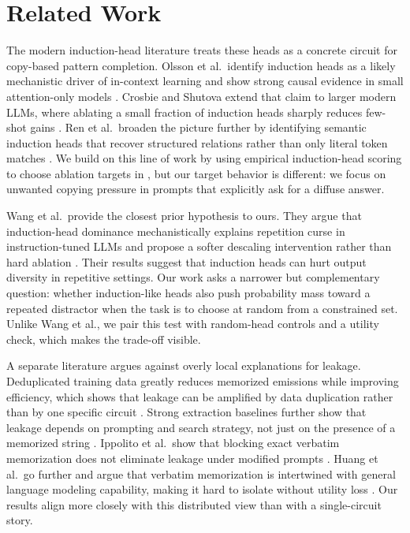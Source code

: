 \section{Related Work}
\label{sec:related-work}

 The modern induction-head literature treats these heads as a concrete circuit for copy-based pattern completion. Olsson et al.\ identify induction heads as a likely mechanistic driver of in-context learning and show strong causal evidence in small attention-only models \cite{olsson2022induction}. Crosbie and Shutova extend that claim to larger modern LLMs, where ablating a small fraction of induction heads sharply reduces few-shot gains \cite{crosbie2024induction}. Ren et al.\ broaden the picture further by identifying semantic induction heads that recover structured relations rather than only literal token matches \cite{ren2024semantic}. We build on this line of work by using empirical induction-head scoring to choose ablation targets in \gptsmall, but our target behavior is different: we focus on unwanted copying pressure in prompts that explicitly ask for a diffuse answer.

 Wang et al.\ provide the closest prior hypothesis to ours. They argue that induction-head dominance mechanistically explains repetition curse in instruction-tuned LLMs and propose a softer descaling intervention rather than hard ablation \cite{wang2025toxicity}. Their results suggest that induction heads can hurt output diversity in repetitive settings. Our work asks a narrower but complementary question: whether induction-like heads also push probability mass toward a repeated distractor when the task is to choose at random from a constrained set. Unlike Wang et al., we pair this test with random-head controls and a utility check, which makes the trade-off visible.

 A separate literature argues against overly local explanations for leakage. Deduplicated training data greatly reduces memorized emissions while improving efficiency, which shows that leakage can be amplified by data duplication rather than by one specific circuit \cite{lee2022deduplicating}. Strong extraction baselines further show that leakage depends on prompting and search strategy, not just on the presence of a memorized string \cite{yu2023bagoftricks}. Ippolito et al.\ show that blocking exact verbatim memorization does not eliminate leakage under modified prompts \cite{ippolito2022falseprivacy}. Huang et al.\ go further and argue that verbatim memorization is intertwined with general language modeling capability, making it hard to isolate without utility loss \cite{huang2024memorization}. Our results align more closely with this distributed view than with a single-circuit story.

